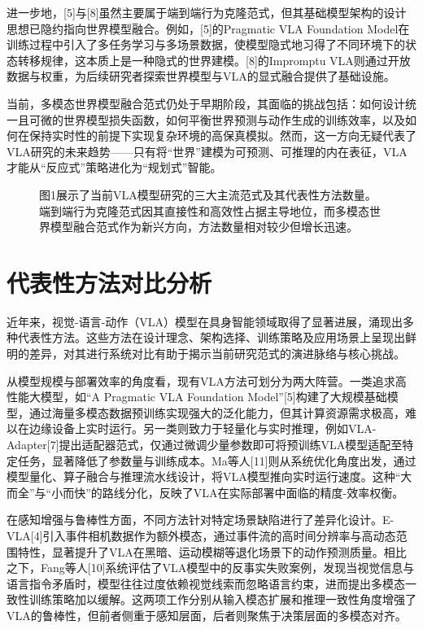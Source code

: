 \documentclass{article}
\begin{document}
进一步地，[5]与[8]虽然主要属于端到端行为克隆范式，但其基础模型架构的设计思想已隐约指向世界模型融合。例如，[5]的Pragmatic VLA Foundation Model在训练过程中引入了多任务学习与多场景数据，使模型隐式地习得了不同环境下的状态转移规律，这本质上是一种隐式的世界建模。[8]的Impromptu VLA则通过开放数据与权重，为后续研究者探索世界模型与VLA的显式融合提供了基础设施。

当前，多模态世界模型融合范式仍处于早期阶段，其面临的挑战包括：如何设计统一且可微的世界模型损失函数，如何平衡世界预测与动作生成的训练效率，以及如何在保持实时性的前提下实现复杂环境的高保真模拟。然而，这一方向无疑代表了VLA研究的未来趋势——只有将“世界”建模为可预测、可推理的内在表征，VLA才能从“反应式”策略进化为“规划式”智能。

\begin{figure}[h]
\centering
\caption{图1展示了当前VLA模型研究的三大主流范式及其代表性方法数量。端到端行为克隆范式因其直接性和高效性占据主导地位，而多模态世界模型融合范式作为新兴方向，方法数量相对较少但增长迅速。}
\label{fig:1}
\end{figure}

\section{代表性方法对比分析}

近年来，视觉-语言-动作（VLA）模型在具身智能领域取得了显著进展，涌现出多种代表性方法。这些方法在设计理念、架构选择、训练策略及应用场景上呈现出鲜明的差异，对其进行系统对比有助于揭示当前研究范式的演进脉络与核心挑战。

从模型规模与部署效率的角度看，现有VLA方法可划分为两大阵营。一类追求高性能大模型，如“A Pragmatic VLA Foundation Model”[5]构建了大规模基础模型，通过海量多模态数据预训练实现强大的泛化能力，但其计算资源需求极高，难以在边缘设备上实时运行。另一类则致力于轻量化与实时推理，例如VLA-Adapter[7]提出适配器范式，仅通过微调少量参数即可将预训练VLA模型适配至特定任务，显著降低了参数量与训练成本。Ma等人[11]则从系统优化角度出发，通过模型量化、算子融合与推理流水线设计，将VLA模型推向实时运行速度。这种“大而全”与“小而快”的路线分化，反映了VLA在实际部署中面临的精度-效率权衡。

在感知增强与鲁棒性方面，不同方法针对特定场景缺陷进行了差异化设计。E-VLA[4]引入事件相机数据作为额外模态，通过事件流的高时间分辨率与高动态范围特性，显著提升了VLA在黑暗、运动模糊等退化场景下的动作预测质量。相比之下，Fang等人[10]系统评估了VLA模型中的反事实失败案例，发现当视觉信息与语言指令矛盾时，模型往往过度依赖视觉线索而忽略语言约束，进而提出多模态一致性训练策略加以缓解。这两项工作分别从输入模态扩展和推理一致性角度增强了VLA的鲁棒性，但前者侧重于感知层面，后者则聚焦于决策层面的多模态对齐。
\end{document}
